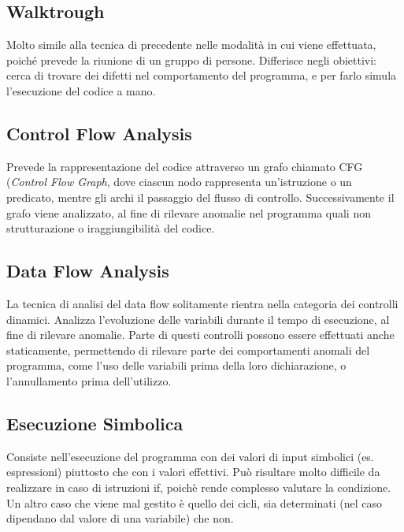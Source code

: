     \subsection{Walktrough}

    Molto simile alla tecnica di precedente nelle modalità in cui viene effettuata, poiché prevede la riunione di un gruppo di persone. Differisce negli obiettivi: cerca di trovare dei difetti nel comportamento del programma, e per farlo simula l'esecuzione del codice a mano.\newline

    \subsection{Control Flow Analysis}

    Prevede la rappresentazione del codice attraverso un grafo chiamato CFG (\textit{Control Flow Graph}, dove ciascun nodo rappresenta un'istruzione o un predicato, mentre gli archi il passaggio del flusso di controllo.
    Successivamente il grafo viene analizzato, al fine di rilevare anomalie nel programma quali non strutturazione o iraggiungibilità del codice.\newline
    
    \subsection{Data Flow Analysis}
    
    La tecnica di analisi del data flow solitamente rientra nella categoria dei controlli dinamici. 
    Analizza l'evoluzione delle variabili durante il tempo di esecuzione, al fine di rilevare anomalie.
    Parte di questi controlli possono essere effettuati anche staticamente, permettendo di rilevare parte dei comportamenti anomali del programma, come l'uso delle variabili prima della loro dichiarazione, o l'annullamento prima dell'utilizzo.\newline
    
    \subsection{Esecuzione Simbolica}
    
    Consiste nell'esecuzione del programma con dei valori di input simbolici (es. espressioni) piuttosto che con i valori effettivi. Può risultare molto difficile da realizzare in caso di istruzioni if, poichè rende complesso valutare la condizione. Un altro caso che viene mal gestito è quello dei cicli, sia determinati (nel caso dipendano dal valore di una variabile) che non.\newline

